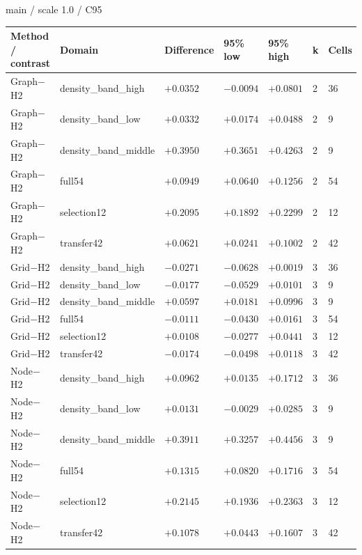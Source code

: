 \par\noindent main / scale 1.0 / C95
\par\nopagebreak[4]
\begin{tabular}{lllllll}
\hline
Method / contrast & Domain & Difference & 95\% low & 95\% high & k & Cells \\
\hline
Graph\ensuremath{-}H2 & density\_band\_high & $+0.0352$ & $-0.0094$ & $+0.0801$ & 2 & 36 \\
Graph\ensuremath{-}H2 & density\_band\_low & $+0.0332$ & $+0.0174$ & $+0.0488$ & 2 & 9 \\
Graph\ensuremath{-}H2 & density\_band\_middle & $+0.3950$ & $+0.3651$ & $+0.4263$ & 2 & 9 \\
Graph\ensuremath{-}H2 & full54 & $+0.0949$ & $+0.0640$ & $+0.1256$ & 2 & 54 \\
Graph\ensuremath{-}H2 & selection12 & $+0.2095$ & $+0.1892$ & $+0.2299$ & 2 & 12 \\
Graph\ensuremath{-}H2 & transfer42 & $+0.0621$ & $+0.0241$ & $+0.1002$ & 2 & 42 \\
Grid\ensuremath{-}H2 & density\_band\_high & $-0.0271$ & $-0.0628$ & $+0.0019$ & 3 & 36 \\
Grid\ensuremath{-}H2 & density\_band\_low & $-0.0177$ & $-0.0529$ & $+0.0101$ & 3 & 9 \\
Grid\ensuremath{-}H2 & density\_band\_middle & $+0.0597$ & $+0.0181$ & $+0.0996$ & 3 & 9 \\
Grid\ensuremath{-}H2 & full54 & $-0.0111$ & $-0.0430$ & $+0.0161$ & 3 & 54 \\
Grid\ensuremath{-}H2 & selection12 & $+0.0108$ & $-0.0277$ & $+0.0441$ & 3 & 12 \\
Grid\ensuremath{-}H2 & transfer42 & $-0.0174$ & $-0.0498$ & $+0.0118$ & 3 & 42 \\
Node\ensuremath{-}H2 & density\_band\_high & $+0.0962$ & $+0.0135$ & $+0.1712$ & 3 & 36 \\
Node\ensuremath{-}H2 & density\_band\_low & $+0.0131$ & $-0.0029$ & $+0.0285$ & 3 & 9 \\
Node\ensuremath{-}H2 & density\_band\_middle & $+0.3911$ & $+0.3257$ & $+0.4456$ & 3 & 9 \\
Node\ensuremath{-}H2 & full54 & $+0.1315$ & $+0.0820$ & $+0.1716$ & 3 & 54 \\
Node\ensuremath{-}H2 & selection12 & $+0.2145$ & $+0.1936$ & $+0.2363$ & 3 & 12 \\
Node\ensuremath{-}H2 & transfer42 & $+0.1078$ & $+0.0443$ & $+0.1607$ & 3 & 42 \\
\hline
\end{tabular}


